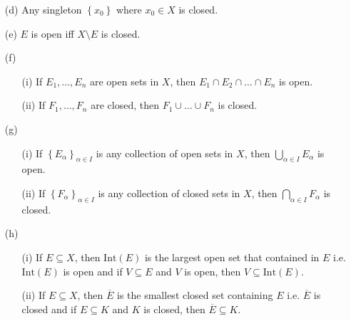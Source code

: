 \begin{proposition}
\begin{itemize}
        \item [(d)] Any singleton \(\left\{ x_0 \right\} \) where \(x_0 \in X\) is closed. 
        \item [(e)] \(E\) is open iff \(X\setminus E\) is closed. 
        \item [(f)]
        \begin{itemize}
            \item [(i)]
        If \(E_1, \dots , E_n\) are open sets in \(X\), then \(E_1 \cap E_2 \cap \dots \cap E_n\) is open.
            \item [(ii)] If \(F_1, \dots , F_n\) are closed, then \(F_1 \cup \dots \cup F_n\) is closed. 
        \end{itemize}
        \item [(g)]
        \begin{itemize}
            \item [(i)] If \(\left\{ E_\alpha  \right\}_{\alpha  \in I} \) is any collection of open sets in \(X\), then \(\bigcup_{\alpha \in I} E_\alpha  \) is open.
            \item [(ii)] If \(\left\{ F_\alpha  \right\}_{\alpha \in I} \) is any collection of closed sets in \(X\), then \(\bigcap_{\alpha  \in I} F_\alpha  \) is closed. 
        \end{itemize}
        \item [(h)] 
        \begin{itemize}
            \item [(i)] If \(E \subseteq X\), then \(\mathrm{Int}(E) \) is the largest open set that contained in \(E\) i.e. \(\mathrm{Int}(E) \) is open and if \(V \subseteq E\) and \(V\) is open, then \(V \subseteq \mathrm{Int}(E) \).
            \item [(ii)] If \(E \subseteq X\), then \(\overline{E} \) is the smallest closed set containing \(E\) i.e. \(\overline{E} \) is closed and if \(E \subseteq K\) and \(K\) is closed, then \(\overline{E} \subseteq K\). 
        \end{itemize}                   
    \end{itemize}
\end{proposition}
